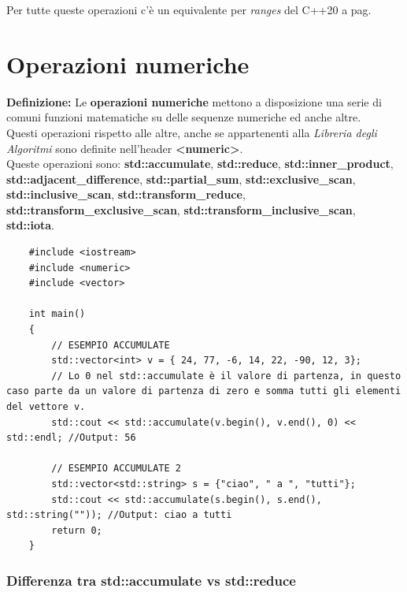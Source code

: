 \textsf{\small Per tutte queste operazioni c'è un equivalente per \emph{ranges} del C++20 a pag. \pageref{ranges}} \\


\newpage

\section{Operazioni numeriche}

\textsf{\small \textbf{Definizione: } Le \textbf{operazioni numeriche} mettono a disposizione una serie di comuni funzioni matematiche su delle sequenze numeriche ed anche altre.} \\

\textsf{\small Questi operazioni rispetto alle altre, anche se appartenenti alla \emph{Libreria degli Algoritmi} sono definite nell'header \textbf{<numeric>}.} \\

\textsf{\small Queste operazioni sono: \textbf{std::accumulate}, \textbf{std::reduce}, \textbf{std::inner\_product}, \textbf{std::adjacent\_difference}, \textbf{std::partial\_sum}, \textbf{std::exclusive\_scan}, \textbf{std::inclusive\_scan}, \textbf{std::transform\_reduce}, \textbf{std::transform\_exclusive\_scan}, \textbf{std::transform\_inclusive\_scan}, \textbf{std::iota}.} \\

\begin{lstlisting}
	#include <iostream>
	#include <numeric>
	#include <vector>
	
	int main()
	{
		// ESEMPIO ACCUMULATE
		std::vector<int> v = { 24, 77, -6, 14, 22, -90, 12, 3};
		// Lo 0 nel std::accumulate è il valore di partenza, in questo caso parte da un valore di partenza di zero e somma tutti gli elementi del vettore v.
		std::cout << std::accumulate(v.begin(), v.end(), 0) << std::endl; //Output: 56
		
		// ESEMPIO ACCUMULATE 2
		std::vector<std::string> s = {"ciao", " a ", "tutti"};
		std::cout << std::accumulate(s.begin(), s.end(), std::string("")); //Output: ciao a tutti 
		return 0;
	}
\end{lstlisting}

\subsubsection{Differenza tra std::accumulate vs std::reduce}

